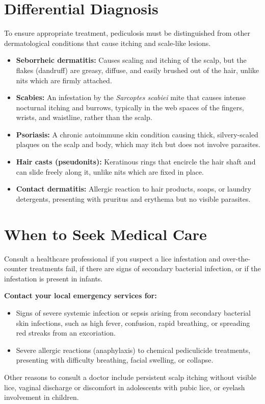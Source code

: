 \section*{Differential Diagnosis}
To ensure appropriate treatment, pediculosis must be distinguished from other dermatological conditions that cause itching and scale-like lesions.
\begin{itemize}
    \item \textbf{Seborrheic dermatitis:} Causes scaling and itching of the scalp, but the flakes (dandruff) are greasy, diffuse, and easily brushed out of the hair, unlike nits which are firmly attached.
    \item \textbf{Scabies:} An infestation by the \textit{Sarcoptes scabiei} mite that causes intense nocturnal itching and burrows, typically in the web spaces of the fingers, wrists, and waistline, rather than the scalp.
    \item \textbf{Psoriasis:} A chronic autoimmune skin condition causing thick, silvery-scaled plaques on the scalp and body, which may itch but does not involve parasites.
    \item \textbf{Hair casts (pseudonits):} Keratinous rings that encircle the hair shaft and can slide freely along it, unlike nits which are fixed in place.
    \item \textbf{Contact dermatitis:} Allergic reaction to hair products, soaps, or laundry detergents, presenting with pruritus and erythema but no visible parasites.
\end{itemize}

\section*{When to Seek Medical Care}
Consult a healthcare professional if you suspect a lice infestation and over-the-counter treatments fail, if there are signs of secondary bacterial infection, or if the infestation is present in infants.

\textbf{Contact your local emergency services for:}
\begin{itemize}
    \item Signs of severe systemic infection or sepsis arising from secondary bacterial skin infections, such as high fever, confusion, rapid breathing, or spreading red streaks from an excoriation.
    \item Severe allergic reactions (anaphylaxis) to chemical pediculicide treatments, presenting with difficulty breathing, facial swelling, or collapse.
\end{itemize}
Other reasons to consult a doctor include persistent scalp itching without visible lice, vaginal discharge or discomfort in adolescents with pubic lice, or eyelash involvement in children.

